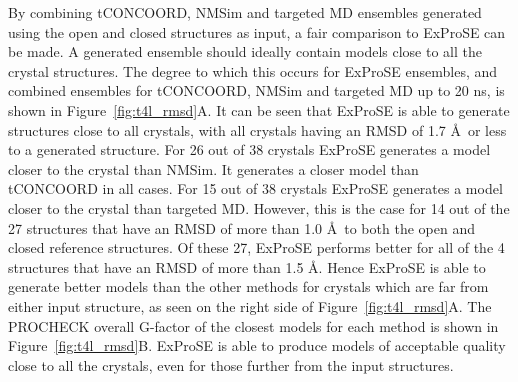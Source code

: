 By combining tCONCOORD, NMSim and targeted MD ensembles generated using the open and closed structures as input, a fair comparison to ExProSE can be made.
A generated ensemble should ideally contain models close to all the crystal structures.
The degree to which this occurs for ExProSE ensembles, and combined ensembles for tCONCOORD, NMSim and targeted MD up to 20 ns, is shown in Figure~\ref{fig:t4l_rmsd}A.
It can be seen that ExProSE is able to generate structures close to all crystals, with all crystals having an RMSD of 1.7 \AA\ or less to a generated structure.
For 26 out of 38 crystals ExProSE generates a model closer to the crystal than NMSim.
It generates a closer model than tCONCOORD in all cases.
For 15 out of 38 crystals ExProSE generates a model closer to the crystal than targeted MD.
However, this is the case for 14 out of the 27 structures that have an RMSD of more than 1.0 \AA\ to both the open and closed reference structures.
Of these 27, ExProSE performs better for all of the 4 structures that have an RMSD of more than 1.5 \AA.
Hence ExProSE is able to generate better models than the other methods for crystals which are far from either input structure, as seen on the right side of Figure~\ref{fig:t4l_rmsd}A.
The PROCHECK overall G-factor of the closest models for each method is shown in Figure~\ref{fig:t4l_rmsd}B.
ExProSE is able to produce models of acceptable quality close to all the crystals, even for those further from the input structures.


